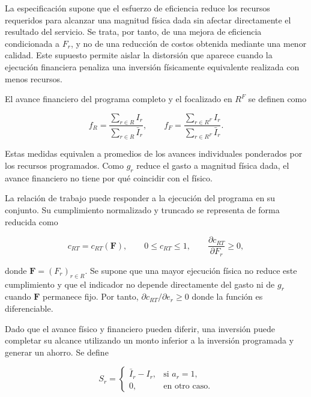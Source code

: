 La especificación supone que el esfuerzo de eficiencia reduce los recursos requeridos para alcanzar una magnitud física dada sin afectar directamente el resultado del servicio. Se trata, por tanto, de una mejora de eficiencia condicionada a \(F_r\), y no de una reducción de costos obtenida mediante una menor calidad. Este supuesto permite aislar la distorsión que aparece cuando la ejecución financiera penaliza una inversión físicamente equivalente realizada con menos recursos.

El avance financiero del programa completo y el focalizado en \(R^F\) se definen como

\begin{equation}
\label{eq:avance_financiero_agregado}
f_R=\frac{\sum_{r\in R}I_r}{\sum_{r\in R}\bar I_r},
\qquad
f_F=\frac{\sum_{r\in R^F}I_r}{\sum_{r\in R^F}\bar I_r}.
\end{equation}

Estas medidas equivalen a promedios de los avances individuales ponderados por los recursos programados. Como \(g_r\) reduce el gasto a magnitud física dada, el avance financiero no tiene por qué coincidir con el físico.

La relación de trabajo puede responder a la ejecución del programa en su conjunto. Su cumplimiento normalizado y truncado se representa de forma reducida como

\begin{equation}
\label{eq:cumplimiento_rt}
c_{RT}=c_{RT}(\mathbf F),
\qquad
0\leq c_{RT}\leq1,
\qquad
\frac{\partial c_{RT}}{\partial F_r}\geq0,
\end{equation}

donde \(\mathbf F=(F_r)_{r\in R}\). Se supone que una mayor ejecución física no reduce este cumplimiento y que el indicador no depende directamente del gasto ni de \(g_r\) cuando \(\mathbf F\) permanece fijo. Por tanto, \(\partial c_{RT}/\partial e_r\geq0\) donde la función es diferenciable.

Dado que el avance físico y financiero pueden diferir, una inversión puede completar su alcance utilizando un monto inferior a la inversión programada y generar un ahorro. Se define

\begin{equation}
\label{eq:ahorro_inversion}
S_r
=
\begin{cases}
\bar I_r-I_r,
&
\text{si } a_r=1,
\\[4pt]
0,
&
\text{en otro caso}.
\end{cases}
\end{equation}

